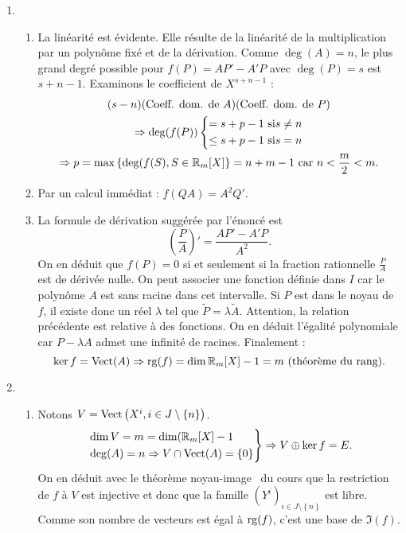 \begin{enumerate}
  \item 
    \begin{enumerate}
      \item La linéarité est évidente. Elle résulte de la linéarité de la multiplication par un polynôme fixé et de la dérivation. Comme $\deg(A) = n$, le plus grand degré possible pour $f(P)=AP' - A'P$ avec $\deg(P)=s$ est $s+n-1$. Examinons le coefficient de $X^{s+n-1}$ :
\begin{multline*}
 (s-n)(\text{Coeff. dom. de }A)(\text{Coeff. dom. de }P) \\
 \Rightarrow
 \deg(f(P))
\left\lbrace 
\begin{aligned}
 = s+p-1    &\text{ si} s \neq n\\
 \leq s+p-1 &\text{ si} s = n
\end{aligned}
\right. \\
\Rightarrow
p = \max\left\lbrace \deg(f(S), S \in \mathbb{R}_m[X] \right\rbrace = n + m -1  \text{ car } n < \frac{m}{2} < m.
\end{multline*}
 
      \item Par un calcul immédiat : $f(QA) = A^2 Q'$.

      \item La formule de dérivation suggérée par l'énoncé est 
\[
  \left(\frac{P}{A}\right)' = \frac{A P' - A'P}{A^2}.
\]
On en déduit que $f(P)=0$ si et seulement si la fraction rationnelle $\frac{P}{A}$ est de dérivée nulle. On peut associer une fonction définie dans $I$ car le polynôme $A$ est sans racine dans cet intervalle. Si $P$ est dans le noyau de $f$, il existe donc un réel $\lambda$ tel que $\widetilde{P}=\lambda\widetilde{A}$. Attention, la relation précédente est relative à des fonctions. On en déduit l'égalité polynomiale car $P-\lambda A$ admet une infinité de racines. Finalement :
\begin{displaymath}
 \ker f = \operatorname{Vect} (A) \Rightarrow \operatorname{rg}(f)=\dim \mathbb{R}_m[X] -1 = m \text{ (théorème du rang)}.
\end{displaymath}
\end{enumerate}

\item \begin{enumerate}
 \item Notons $V = \operatorname{Vect} \left( X^i , i\in J\setminus\left\lbrace n \right\rbrace \right)$. 
\[
  \left.
  \begin{aligned}
    &\dim V = m = \dim(\mathbb{R}_m[X]-1\\
    &\deg(A) = n \Rightarrow V \cap \operatorname{Vect}(A)= \left\lbrace 0 \right\rbrace
  \end{aligned}
\right\rbrace \Rightarrow 
V \oplus \ker f = E.
\]
 On en déduit avec le théorème \og noyau-image\fg~ du cours que la restriction de $f$ à $V$ est injective et donc que la famille $\left( Y^i\right)_{i\in J \setminus\left\lbrace n \right\rbrace }$ est libre. Comme son nombre de vecteurs est égal à $\operatorname{rg}(f)$, c'est une base de $\Im(f)$.
 

\end{enumerate}
\end{enumerate}
